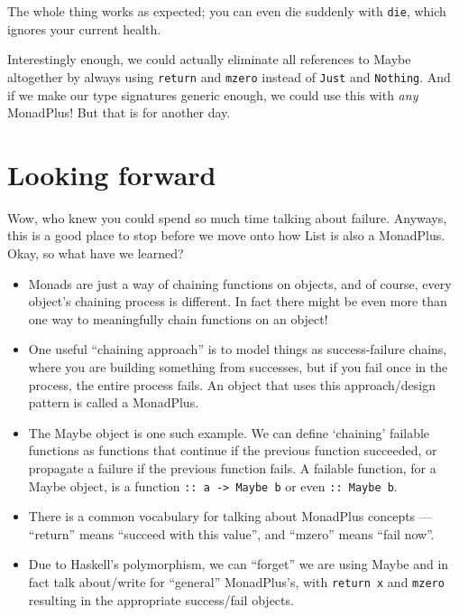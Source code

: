 \documentclass[]{article}
\begin{document}
The whole thing works as expected; you can even die suddenly with \texttt{die},
which ignores your current health.

Interestingly enough, we could actually eliminate all references to Maybe
altogether by always using \texttt{return} and \texttt{mzero} instead of
\texttt{Just} and \texttt{Nothing}. And if we make our type signatures generic
enough, we could use this with \emph{any} MonadPlus! But that is for another
day.

\hypertarget{looking-forward}{%
\section{Looking forward}\label{looking-forward}}

Wow, who knew you could spend so much time talking about failure. Anyways, this
is a good place to stop before we move onto how List is also a MonadPlus. Okay,
so what have we learned?

\begin{itemize}
\tightlist
\item
  Monads are just a way of chaining functions on objects, and of course, every
  object's chaining process is different. In fact there might be even more than
  one way to meaningfully chain functions on an object!
\item
  One useful ``chaining approach'' is to model things as success-failure chains,
  where you are building something from successes, but if you fail once in the
  process, the entire process fails. An object that uses this approach/design
  pattern is called a MonadPlus.
\item
  The Maybe object is one such example. We can define `chaining' failable
  functions as functions that continue if the previous function succeeded, or
  propagate a failure if the previous function fails. A failable function, for a
  Maybe object, is a function \texttt{::\ a\ -\textgreater{}\ Maybe\ b} or even
  \texttt{::\ Maybe\ b}.
\item
  There is a common vocabulary for talking about MonadPlus concepts ---
  ``return'' means ``succeed with this value'', and ``mzero'' means ``fail
  now''.
\item
  Due to Haskell's polymorphism, we can ``forget'' we are using Maybe and in
  fact talk about/write for ``general'' MonadPlus's, with \texttt{return\ x} and
  \texttt{mzero} resulting in the appropriate success/fail objects.
\end{itemize}
\end{document}
